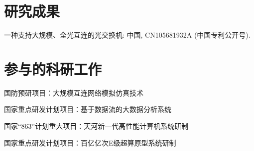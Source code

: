 \begin{resume}
  \section*{研究成果} %
  \begin{enumerate}[{[}1{]}]
  \addtolength{\itemsep}{-.36\baselineskip}%
  \item  一种支持大规模、全光互连的光交换机: 中国,
     CN105681932A (中国专利公开号).
  \end{enumerate}


\section*{参与的科研工作}

  \begin{enumerate}[{[}1{]}]
  \addtolength{\itemsep}{-.36\baselineskip}%
  \item 国防预研项目：大规模互连网络模拟仿真技术
  \item 国家重点研发计划项目：基于数据流的大数据分析系统
  \item 国家“863”计划重大项目：天河新一代高性能计算机系统研制
  \item 国家重点研发计划项目：百亿亿次E级超算原型系统研制
  \end{enumerate}
\end{resume}
